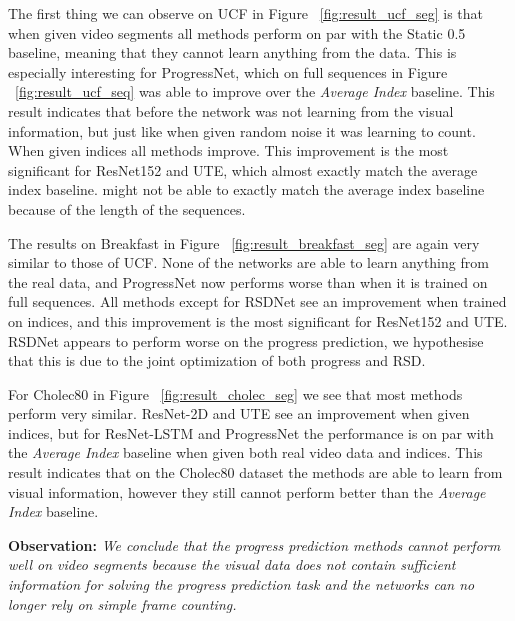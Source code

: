 The first thing we can observe on UCF in Figure ~\ref{fig:result_ucf_seg} is that when given video segments all methods perform on par with the Static 0.5 baseline, meaning that they cannot learn anything from the data. This is especially interesting for ProgressNet, which on full sequences in Figure ~\ref{fig:result_ucf_seq} was able to improve over the \textsl{Average Index} baseline. This result indicates that before the network was not learning from the visual information, but just like when given random noise it was learning to count. When given indices all methods improve. This improvement is the most significant for ResNet152 and UTE, which almost exactly match the average index baseline. might not be able to exactly match the average index baseline because of the length of the sequences.

The results on Breakfast in Figure ~\ref{fig:result_breakfast_seg} are again very similar to those of UCF. None of the networks are able to learn anything from the real data, and ProgressNet now performs worse than when it is trained on full sequences. All methods except for RSDNet see an improvement when trained on indices, and this improvement is the most significant for ResNet152 and UTE. RSDNet appears to perform worse on the progress prediction, we hypothesise that this is due to the joint optimization of both progress and RSD.

For Cholec80 in Figure ~\ref{fig:result_cholec_seg} we see that most methods perform very similar. ResNet-2D and UTE see an improvement when given indices, but for ResNet-LSTM and ProgressNet the performance is on par with the \textsl{Average Index} baseline when given both real video data and indices. This result indicates that on the Cholec80 dataset the methods are able to learn from visual information, however they still cannot perform better than the \textsl{Average Index} baseline.

\smallskip\noindent\textbf{Observation:} \emph{We conclude that the progress prediction methods cannot perform well on video segments because the visual data does not contain sufficient information for solving the progress prediction task and the networks can no longer rely on simple frame counting.}


